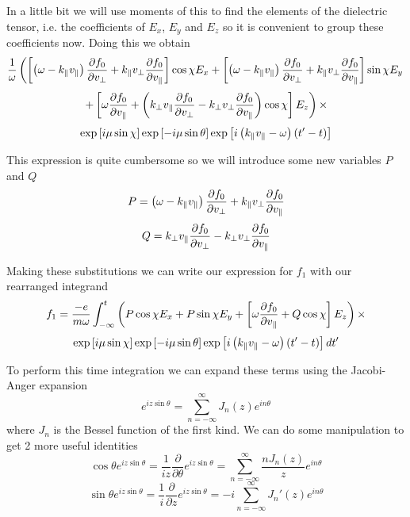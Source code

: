 In a little bit we will use moments of this to find the elements of the dielectric tensor, i.e. the coefficients of $E_x$, $E_y$ and $E_z$ so it is convenient to group these coefficients now. Doing this we obtain
\begin{equation*}
	\frac{1}{\omega} \left( \left[ \left(\omega-k_\parallel v_\parallel\right)\frac{\partial f_0}{\partial v_\perp} + k_\parallel v_\perp\frac{\partial f_0}{\partial v_\parallel} \right]\cos\chi E_x + \left[ \left(\omega-k_\parallel v_\parallel\right)\frac{\partial f_0}{\partial v_\perp} + k_\parallel v_\perp\frac{\partial f_0}{\partial v_\parallel} \right]\sin\chi E_y \right.
\end{equation*}
\begin{equation*}
	\left. + \left[ \omega\frac{\partial f_0}{\partial v_\parallel} + \left(k_\perp v_\parallel\frac{\partial f_0}{\partial v_\perp} - k_\perp v_\perp\frac{\partial f_0}{\partial v_\parallel}\right)\cos\chi \right] E_z \right) \times
\end{equation*}
\begin{equation}
	\exp \left[i\mu \sin\chi \right] \exp \left[-i\mu \sin\theta \right] \exp \left[i\left(k_\parallel v_\parallel - \omega\right) \left(t' - t\right)\right]
\end{equation}

This expression is quite cumbersome so we will introduce some new variables $P$ and $Q$
\begin{equation}
	P = \left(\omega-k_\parallel v_\parallel\right)\frac{\partial f_0}{\partial v_\perp} + k_\parallel v_\perp\frac{\partial f_0}{\partial v_\parallel}
\end{equation}
\begin{equation}
	Q = k_\perp v_\parallel\frac{\partial f_0}{\partial v_\perp} - k_\perp v_\perp\frac{\partial f_0}{\partial v_\parallel}
\end{equation}

Making these substitutions we can write our expression for $f_1$ with our rearranged integrand
\begin{equation*}
	f_1 = \frac{-e}{m \omega} \int_{-\infty}^t \left(P\cos\chi E_x + P\sin\chi E_y + \left[\omega\frac{\partial f_0}{\partial v_\parallel} +Q\cos\chi\right]E_z \right) \times
\end{equation*}
\begin{equation}
	\exp \left[i\mu \sin\chi \right] \exp \left[-i\mu \sin\theta \right] \exp \left[i\left(k_\parallel v_\parallel - \omega\right) \left(t' - t\right)\right] dt'
\end{equation}

To perform this time integration we can expand these terms using the Jacobi-Anger expansion
\begin{equation}\label{jacobi_anger}
	e^{iz\sin\theta} = \sum_{n=-\infty}^\infty J_n\left(z\right) e^{in\theta}
\end{equation}
where $J_n$ is the Bessel function of the first kind. We can do some manipulation to get 2 more useful identities
\begin{equation}\label{jacobi_anger_cos}
	\cos\theta e^{iz\sin\theta} = \frac{1}{iz}\frac{\partial}{\partial\theta}e^{iz\sin\theta} = \sum_{n=-\infty}^\infty \frac{nJ_n\left(z\right)}{z}e^{in\theta}
\end{equation}
\begin{equation}\label{jacobi_anger_sin}
	\sin\theta e^{iz\sin\theta} = \frac{1}{i}\frac{\partial}{\partial z}e^{iz\sin\theta} = -i\sum_{n=-\infty}^\infty J_n' \left(z\right)e^{in\theta}
\end{equation}

